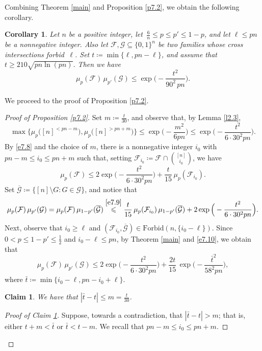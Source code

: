 \documentclass[10pt,a4paper]{amsart}
\newtheorem{cor}[thm]{Corollary}
\newtheorem{claim}[thm]{Claim}
\theoremstyle{remark}
\newcommand{\meg}{\geqslant}
\newcommand{\mik}{\leqslant}
\newcommand{\Fcal}{\mathcal{F}}
\newcommand{\Gcal}{\mathcal{G}}
\begin{document}
Combining Theorem \ref{main} and Proposition \ref{p7.2}, we obtain the following corollary.
\begin{cor} \label{c7.3}
Let $n$ be a positive integer, let\, $\frac{6}{n}\mik p\mik p'\mik 1-p$, and
let $\ell\mik pn$ be a nonnegative integer. Also let $\Fcal,\Gcal\subseteq \{0,1\}^n$ be two families whose
cross intersections forbid\, $\ell$. Set $t\coloneqq \min\{\ell,pn-\ell\}$, and assume that
$t\meg 210 \sqrt{pn\ln(pn)}$. Then we have
\begin{equation} \label{e7.7}
\mu_p(\Fcal)\, \mu_{p'}(\Gcal) \mik \exp\Big( - \frac{t^2}{90^2\, pn}\Big).
\end{equation}
\end{cor}
We proceed to the proof of Proposition \ref{p7.2}.
\begin{proof}[Proof of Proposition \emph{\ref{p7.2}}]
Set $m\coloneqq \frac{t}{30}$, and observe that, by Lemma \ref{l2.3},
\begin{equation} \label{e7.8}
\max\big\{ \mu_p\big([n]^{<pn-m}\big), \mu_p\big([n]^{>pn+m}\big)\big\} \mik \exp\Big(-\frac{m^2}{6pn}\Big)
\mik \exp\Big(- \frac{t^2}{6\cdot 30^2pn}\Big).
\end{equation}
By \eqref{e7.8} and the choice of $m$, there is a nonnegative integer $i_0$ with $pn-m\mik i_0\mik pn+m$
such that, setting $\Fcal_{i_0}\coloneqq \Fcal\cap \binom{[n]}{i_0}$, we have
\begin{equation} \label{e7.9}
\mu_p(\Fcal) \mik 2\exp\Big(- \frac{t^2}{6\cdot 30^2pn}\Big)+\frac{t}{15}\, \mu_p(\Fcal_{i_0}).
\end{equation}
Set $\overline{\Gcal}\coloneqq \big\{ [n]\setminus G: G\in \Gcal\big\}$, and notice that
\begin{equation} \label{e7.10}
\mu_p(\Fcal)\, \mu_{p'}(\Gcal)=\mu_p(\Fcal)\, \mu_{1-p'}(\overline{\Gcal}) \stackrel{\eqref{e7.9}}{\mik}
\frac{t}{15}\, \mu_p(\Fcal_{i_0})\, \mu_{1-p'}(\overline{\Gcal}) + 2\exp\Big(- \frac{t^2}{6\cdot 30^2pn}\Big).
\end{equation}
Next, observe that $i_0\meg \ell$ and $(\Fcal_{i_0},\overline{\Gcal})\in\mathrm{Forbid}(n,\{i_0-\ell\})$.
Since $0<p\mik 1-p'\mik \frac12$ and $i_0-\ell\mik pn$, by Theorem \ref{main} and \eqref{e7.10}, we obtain that
\begin{equation} \label{e7.11}
\mu_p(\Fcal)\, \mu_{p'}(\Gcal) \mik  2\exp\Big(- \frac{t^2}{6\cdot 30^2pn}\Big) +
\frac{2t}{15}\,  \exp\Big(- \frac{\bar{t}^2}{58^2 pn}\Big),
\end{equation}
where $\bar{t}\coloneqq \min\{i_0-\ell, pn-i_0+\ell\}$.
\begin{claim} \label{cnew}
We have that $|\bar{t}-t|\mik m=\frac{t}{30}$.
\end{claim}
\begin{proof}[Proof of Claim \emph{\ref{cnew}}]
Suppose, towards a contradiction, that $|\bar{t}-t|>m$; that is, either $t+m<\bar{t}$ or $\bar{t}<t-m$.
We recall that $pn-m\mik i_0\mik pn+m$.


\end{proof}
\end{proof}
\end{document}
